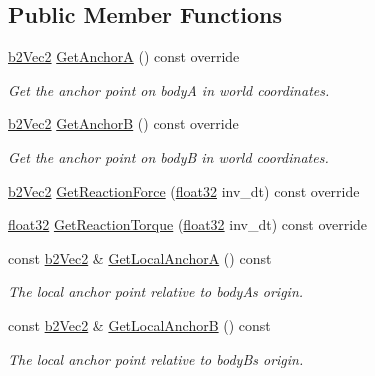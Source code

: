 \subsection*{Public Member Functions}
\begin{DoxyCompactItemize}
\item 
\mbox{\hyperlink{structb2_vec2}{b2\+Vec2}} \mbox{\hyperlink{classb2_distance_joint_ae228d3ce27009acd8a20c2570fb1183c}{Get\+AnchorA}} () const override
\begin{DoxyCompactList}\small\item\em Get the anchor point on bodyA in world coordinates. \end{DoxyCompactList}\item 
\mbox{\hyperlink{structb2_vec2}{b2\+Vec2}} \mbox{\hyperlink{classb2_distance_joint_a05bf71de10904c87e3a5295aa04a8aa6}{Get\+AnchorB}} () const override
\begin{DoxyCompactList}\small\item\em Get the anchor point on bodyB in world coordinates. \end{DoxyCompactList}\item 
\mbox{\hyperlink{structb2_vec2}{b2\+Vec2}} \mbox{\hyperlink{classb2_distance_joint_a6aa951e5bbfcae8a617987955cadbed5}{Get\+Reaction\+Force}} (\mbox{\hyperlink{b2_settings_8h_aacdc525d6f7bddb3ae95d5c311bd06a1}{float32}} inv\+\_\+dt) const override
\item 
\mbox{\hyperlink{b2_settings_8h_aacdc525d6f7bddb3ae95d5c311bd06a1}{float32}} \mbox{\hyperlink{classb2_distance_joint_ad7ac78c4c20c122b944947d523a02982}{Get\+Reaction\+Torque}} (\mbox{\hyperlink{b2_settings_8h_aacdc525d6f7bddb3ae95d5c311bd06a1}{float32}} inv\+\_\+dt) const override
\item 
const \mbox{\hyperlink{structb2_vec2}{b2\+Vec2}} \& \mbox{\hyperlink{classb2_distance_joint_aaa881128071c62f21898a75d5b20308a}{Get\+Local\+AnchorA}} () const
\begin{DoxyCompactList}\small\item\em The local anchor point relative to bodyA\textquotesingle{}s origin. \end{DoxyCompactList}\item 
const \mbox{\hyperlink{structb2_vec2}{b2\+Vec2}} \& \mbox{\hyperlink{classb2_distance_joint_a214a1cca8854613d7401c9a5892a28c9}{Get\+Local\+AnchorB}} () const
\begin{DoxyCompactList}\small\item\em The local anchor point relative to bodyB\textquotesingle{}s origin. \end{DoxyCompactList}\item 

\end{DoxyCompactItemize}
